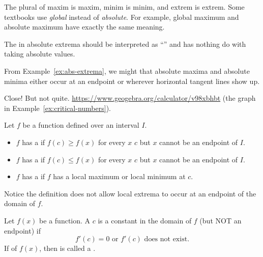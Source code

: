 \documentclass[../main.tex]{subfiles}
\begin{document}
The plural of maxim is maxim, minim is minim, and extrem is extrem.  Some textbooks use \emph{global} instead of \emph{absolute}. For example, global maximum and absolute maximum have exactly the same meaning.

\faExclamationTriangle{} The  in absolute extrema should be interpreted as ``'' and has nothing do with taking absolute values.
\clearpage

From Example~\ref{ex:abs-extrema}, we might  that absolute maxima and absolute minima either occur at an endpoint or wherever horizontal tangent lines show up.

Close! But not quite. \url{https://www.geogebra.org/calculator/v98xbhbt} (the graph in Example~\ref{ex:critical-numbers}).

\begin{mdframed}[style=withref-compact]
  Let \(f\) be a function defined over an interval \(I\).

  \begin{itemize}[noitemsep]
    \item \(f\) has a  if \(f(c) \ge f(x)\) for every \(x\)  \(c\) but \(x\) cannot be an endpoint of \(I\).
    \item \(f\) has a  if \(f(c) \le f(x)\) for every \(x\)  \(c\) but \(x\) cannot be an endpoint of \(I\).
    \item \(f\) has a  if \(f\) has a local maximum or local minimum at \(c\).
  \end{itemize}

\end{mdframed}
\faExclamationTriangle{} Notice the definition does not allow local extrema to occur at an endpoint of the domain of \(f\).

\begin{mdframed}[style=withref-compact]
  Let \(f(x)\) be a function. A  \(c\) is a constant in the domain of \(f\) (but NOT an endpoint) if 
  \[
    f'(c) = 0 \text{ or } f'(c) \text{ does not exist}.
  \]
  If  of \(f(x)\), then  is called a .

\end{mdframed}
\end{document}
